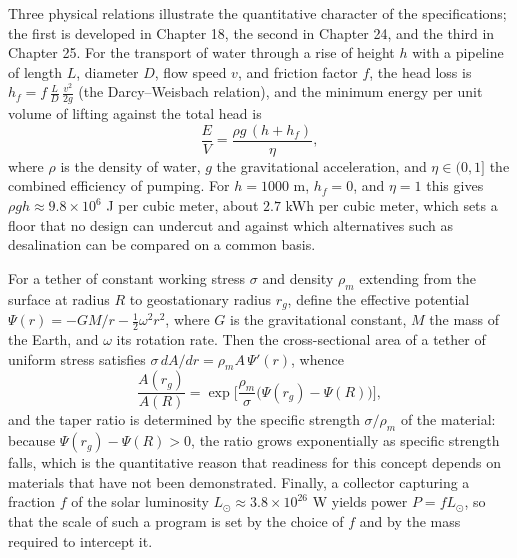 Three physical relations illustrate the quantitative character of the specifications; the first is developed in Chapter 18, the second in Chapter 24, and the third in Chapter 25. For the transport of water through a rise of height $h$ with a pipeline of length $L$, diameter $D$, flow speed $v$, and friction factor $f$, the head loss is $h_f=f\,\tfrac{L}{D}\,\tfrac{v^2}{2g}$ (the Darcy--Weisbach relation), and the minimum energy per unit volume of lifting against the total head is
\[
\frac{E}{V}=\frac{\rho g\,(h+h_f)}{\eta},
\]
where $\rho$ is the density of water, $g$ the gravitational acceleration, and $\eta\in(0,1]$ the combined efficiency of pumping. For $h=1000$ m, $h_f=0$, and $\eta=1$ this gives $\rho g h\approx 9.8\times10^6$ J per cubic meter, about $2.7$ kWh per cubic meter, which sets a floor that no design can undercut and against which alternatives such as desalination can be compared on a common basis.

For a tether of constant working stress $\sigma$ and density $\rho_m$ extending from the surface at radius $R$ to geostationary radius $r_g$, define the effective potential $\Psi(r)=-GM/r-\tfrac12\omega^2r^2$, where $G$ is the gravitational constant, $M$ the mass of the Earth, and $\omega$ its rotation rate. Then the cross-sectional area of a tether of uniform stress satisfies $\sigma\,dA/dr=\rho_m A\,\Psi'(r)$, whence
\[
\frac{A(r_g)}{A(R)}=\exp\!\Big[\frac{\rho_m}{\sigma}\big(\Psi(r_g)-\Psi(R)\big)\Big],
\]
and the taper ratio is determined by the specific strength $\sigma/\rho_m$ of the material: because $\Psi(r_g)-\Psi(R)>0$, the ratio grows exponentially as specific strength falls, which is the quantitative reason that readiness for this concept depends on materials that have not been demonstrated. Finally, a collector capturing a fraction $f$ of the solar luminosity $L_\odot\approx3.8\times10^{26}$ W yields power $P=fL_\odot$, so that the scale of such a program is set by the choice of $f$ and by the mass required to intercept it.
